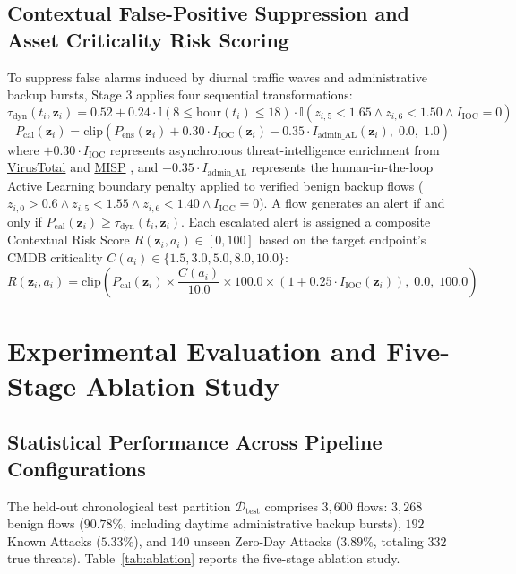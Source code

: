 \documentclass[10pt,a4paper]{article}
\begin{document}
\subsection{Contextual False-Positive Suppression and Asset Criticality Risk Scoring}
To suppress false alarms induced by diurnal traffic waves and administrative backup bursts, Stage 3 applies four sequential transformations:
\begin{equation}
\tau_{\text{dyn}}(t_i, \mathbf{z}_i) = 0.52 + 0.24 \cdot \mathbb{I}(8 \le \text{hour}(t_i) \le 18) \cdot \mathbb{I}(z_{i,5} < 1.65 \land z_{i,6} < 1.50 \land I_{\text{IOC}} = 0)
\end{equation}
\begin{equation}
P_{\text{cal}}(\mathbf{z}_i) = \text{clip}\!\left( P_{\text{ens}}(\mathbf{z}_i) + 0.30 \cdot I_{\text{IOC}}(\mathbf{z}_i) - 0.35 \cdot I_{\text{admin\_AL}}(\mathbf{z}_i), \; 0.0, \; 1.0 \right)
\end{equation}
where $+0.30 \cdot I_{\text{IOC}}$ represents asynchronous threat-intelligence enrichment from \href{https://docs.virustotal.com/docs/what-is-yara}{VirusTotal} \cite{yara} and \href{https://www.misp-project.org/}{MISP} \cite{misp}, and $-0.35 \cdot I_{\text{admin\_AL}}$ represents the human-in-the-loop Active Learning boundary penalty applied to verified benign backup flows ($z_{i,0} > 0.6 \land z_{i,5} < 1.55 \land z_{i,6} < 1.40 \land I_{\text{IOC}} = 0$). A flow generates an alert if and only if $P_{\text{cal}}(\mathbf{z}_i) \ge \tau_{\text{dyn}}(t_i, \mathbf{z}_i)$. Each escalated alert is assigned a composite Contextual Risk Score $R(\mathbf{z}_i, a_i) \in [0, 100]$ based on the target endpoint's CMDB criticality $C(a_i) \in \{1.5, 3.0, 5.0, 8.0, 10.0\}$:
\begin{equation}
R(\mathbf{z}_i, a_i) = \text{clip}\!\left( P_{\text{cal}}(\mathbf{z}_i) \times \frac{C(a_i)}{10.0} \times 100.0 \times \left(1 + 0.25 \cdot I_{\text{IOC}}(\mathbf{z}_i)\right), \; 0.0, \; 100.0 \right)
\end{equation}

\section{Experimental Evaluation and Five-Stage Ablation Study}
\subsection{Statistical Performance Across Pipeline Configurations}
The held-out chronological test partition $\mathcal{D}_{\text{test}}$ comprises $3,600$ flows: $3,268$ benign flows ($90.78\%$, including daytime administrative backup bursts), $192$ Known Attacks ($5.33\%$), and $140$ unseen Zero-Day Attacks ($3.89\%$, totaling $332$ true threats). Table~\ref{tab:ablation} reports the five-stage ablation study.
\end{document}
